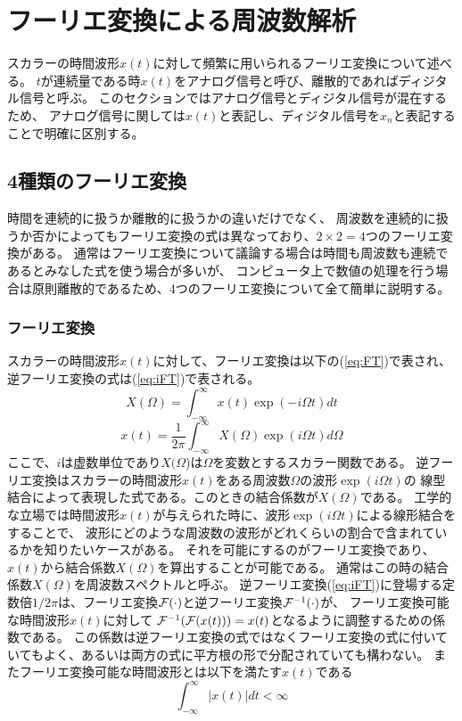 
\section{フーリエ変換による周波数解析}
スカラーの時間波形\(x(t)\)に対して頻繁に用いられるフーリエ変換について述べる。
\(t\)が連続量である時\(x(t)\)をアナログ信号と呼び、離散的であればディジタル信号と呼ぶ。
このセクションではアナログ信号とディジタル信号が混在するため、
アナログ信号に関しては\(x(t)\)と表記し、ディジタル信号を\(x_n\)と表記することで明確に区別する。
\subsection{4種類のフーリエ変換}
時間を連続的に扱うか離散的に扱うかの違いだけでなく、
周波数を連続的に扱うか否かによってもフーリエ変換の式は異なっており、\(2\times 2 = 4\)つのフーリエ変換がある。
通常はフーリエ変換について議論する場合は時間も周波数も連続であるとみなした式を使う場合が多いが、
コンピュータ上で数値の処理を行う場合は原則離散的であるため、4つのフーリエ変換について全て簡単に説明する。

\subsubsection{フーリエ変換}
スカラーの時間波形\(x(t)\)に対して、フーリエ変換は以下の(\ref{eq:FT})で表され、
逆フーリエ変換の式は(\ref{eq:iFT})で表される。
\begin{equation}
    X(\Omega)=\int_{-\infty}^{\infty} x(t)\exp(-i\Omega t)dt
    \label{eq:FT}
\end{equation}
\begin{equation}
    x(t)=\frac{1}{2\pi} \int_{-\infty}^{\infty} X(\Omega)\exp(i\Omega t)d\Omega
    \label{eq:iFT}
\end{equation}
ここで、\(i\)は虚数単位であり\(X(\Omega\))は\(\Omega\)を変数とするスカラー関数である。
逆フーリエ変換はスカラーの時間波形\(x(t)\)をある周波数\(\Omega\)の波形\(\exp(i\Omega t)\)の
線型結合によって表現した式である。このときの結合係数が\(X(\Omega)\)である。
工学的な立場では時間波形\(x(t)\)が与えられた時に、波形\(\exp(i\Omega t)\)による線形結合をすることで、
波形にどのような周波数の波形がどれくらいの割合で含まれているかを知りたいケースがある。
それを可能にするのがフーリエ変換であり、\(x(t)\)から結合係数\(X(\Omega)\)を算出することが可能である。
通常はこの時の結合係数\(X(\Omega)\)を周波数スペクトルと呼ぶ。
逆フーリエ変換(\ref{eq:iFT})に登場する定数倍\(1/2\pi\)は、フーリエ変換\(\cal F(\cdot)\)と逆フーリエ変換\({\cal F}^{-1}(\cdot)\)が、
フーリエ変換可能な時間波形\(x(t)\)に対して
\({\cal F}^{-1}({\cal F}(x(t))) = x(t)\)となるように調整するための係数である。
この係数は逆フーリエ変換の式ではなくフーリエ変換の式に付いていてもよく、あるいは両方の式に平方根の形で分配されていても構わない。
またフーリエ変換可能な時間波形とは以下を満たす\(x(t)\)である
\begin{equation}
    \int_{-\infty}^{\infty}|x(t)|dt < \infty
\end{equation}

